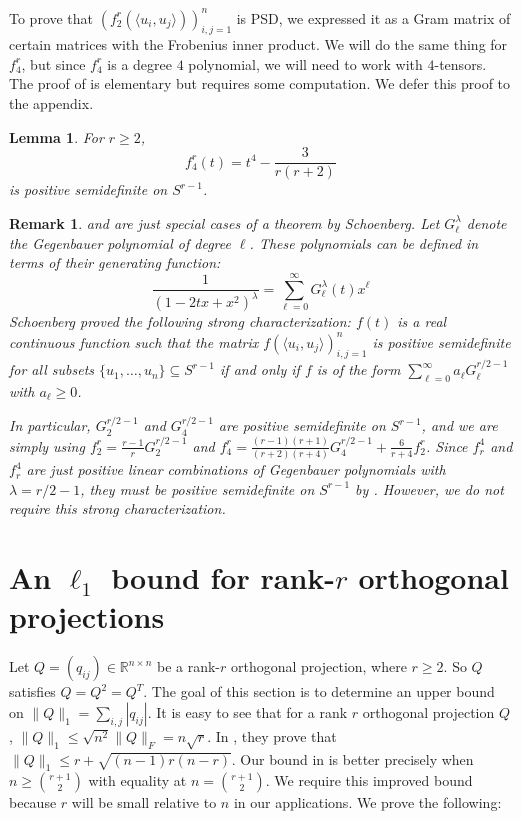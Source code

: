 \documentclass[12pt]{amsart}
\newtheorem{lemma}[lemma]{Lemma}
\theoremstyle{myremark}
\newtheorem{remark}[remark]{Remark}
\newcommand{\R}{\mathbb{R}}
\newcommand{\1}{\mathbf{1}}
\newcommand{\inner}[2]{\langle #1,#2\rangle}
\begin{document}
To prove that $(f_2^r(\inner{u_i}{u_j}))_{i,j=1}^n$ is PSD, we expressed it as a Gram matrix of certain matrices with the Frobenius inner product. We will do the same thing for $f_4^r$, but since $f_4^r$ is a degree $4$ polynomial, we will need to work with $4$-tensors. The proof of  is elementary but requires some computation. We defer this proof to the appendix.


\begin{lemma}\label{lem:psd4}
For $r \geq 2$,
\[
f_4^r(t)=t^4-\frac{3}{r(r+2)}
\]
is positive semidefinite on \(S^{r-1}\).
\end{lemma}

\begin{remark}
 and  are just special cases of a theorem by Schoenberg\cite{Schoenberg42}. Let $G_\ell^{\lambda}$ denote the Gegenbauer polynomial of degree $\ell$. These polynomials can be defined in terms of their generating function\cite{stein1971introduction}: 
\[\frac{1}{(1 - 2tx + x^2)^\lambda} = \sum_{\ell=0}^\infty G_{\ell}^\lambda (t) x^{\ell}\]
Schoenberg proved the following strong characterization: $f(t)$ is a real continuous function such that the matrix $f(\inner{u_i}{u_j})_{i,j=1}^n$ is positive semidefinite for all subsets $\{u_1,\ldots,u_n\}\subseteq S^{r-1}$ if and only if $f$ is of the form $\sum_{\ell=0}^\infty a_{\ell} G_{\ell}^{r/2-1}$ with $a_{\ell} \geq 0$.


In particular, $G_2^{r/2-1}$ and $G_4^{r/2-1}$ are positive semidefinite on $S^{r-1}$, and we are simply using $f_2^r = \frac{r-1}{r} G_2^{r/2-1}$ and $f_4^r = \frac{(r-1)(r+1)}{(r+2)(r+4)} G_4^{r/2-1} + \frac{6}{r+4} f_2^r$. Since $f_r^4$ and $f_r^4$ are just positive linear combinations of Gegenbauer polynomials with $\lambda = r/2-1$, they must be positive semidefinite on $S^{r-1}$ by \cite{Schoenberg42}. However, we do not require this strong characterization.  
\end{remark}








\section{An $\ell_1$ bound for rank-$r$ orthogonal projections}\label{sec:l1}

Let $Q=(q_{ij})\in \R^{n\times n}$ be a rank-$r$ orthogonal projection, where $r\ge 2$. So $Q$ satisfies $Q = Q^2 = Q^T$. The goal of this section is to determine an upper bound on $\|Q\|_1 = \sum_{i,j} |q_{ij}|$. It is easy to see that for a rank $r$ orthogonal projection $Q$, $\|Q\|_1 \leq \sqrt{n^2}\|Q\|_F = n \sqrt{r}$. In \cite{MagsinoMixonParshall2019}, they prove that $\|Q\|_1 \leq r + \sqrt{(n-1)r(n-r)}$. Our bound in  is better precisely when $n \geq \binom{r+1}{2}$ with equality at $n = \binom{r+1}{2}$. We require this improved bound because $r$ will be small relative to $n$ in our applications. We prove the following:
\end{document}
